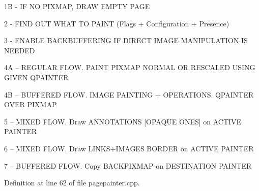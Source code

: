 1\+B -\/ I\+F N\+O P\+I\+X\+M\+A\+P, D\+R\+A\+W E\+M\+P\+T\+Y P\+A\+G\+E

2 -\/ F\+I\+N\+D O\+U\+T W\+H\+A\+T T\+O P\+A\+I\+N\+T (Flags + Configuration + Presence)

3 -\/ E\+N\+A\+B\+L\+E B\+A\+C\+K\+B\+U\+F\+F\+E\+R\+I\+N\+G I\+F D\+I\+R\+E\+C\+T I\+M\+A\+G\+E M\+A\+N\+I\+P\+U\+L\+A\+T\+I\+O\+N I\+S N\+E\+E\+D\+E\+D

4\+A -- R\+E\+G\+U\+L\+A\+R F\+L\+O\+W. P\+A\+I\+N\+T P\+I\+X\+M\+A\+P N\+O\+R\+M\+A\+L O\+R R\+E\+S\+C\+A\+L\+E\+D U\+S\+I\+N\+G G\+I\+V\+E\+N Q\+P\+A\+I\+N\+T\+E\+R

4\+B -- B\+U\+F\+F\+E\+R\+E\+D F\+L\+O\+W. I\+M\+A\+G\+E P\+A\+I\+N\+T\+I\+N\+G + O\+P\+E\+R\+A\+T\+I\+O\+N\+S. Q\+P\+A\+I\+N\+T\+E\+R O\+V\+E\+R P\+I\+X\+M\+A\+P

5 -- M\+I\+X\+E\+D F\+L\+O\+W. Draw A\+N\+N\+O\+T\+A\+T\+I\+O\+N\+S \mbox{[}O\+P\+A\+Q\+U\+E O\+N\+E\+S\mbox{]} on A\+C\+T\+I\+V\+E P\+A\+I\+N\+T\+E\+R

6 -- M\+I\+X\+E\+D F\+L\+O\+W. Draw L\+I\+N\+K\+S+\+I\+M\+A\+G\+E\+S B\+O\+R\+D\+E\+R on A\+C\+T\+I\+V\+E P\+A\+I\+N\+T\+E\+R

7 -- B\+U\+F\+F\+E\+R\+E\+D F\+L\+O\+W. Copy B\+A\+C\+K\+P\+I\+X\+M\+A\+P on D\+E\+S\+T\+I\+N\+A\+T\+I\+O\+N P\+A\+I\+N\+T\+E\+R 

Definition at line 62 of file pagepainter.\+cpp.


